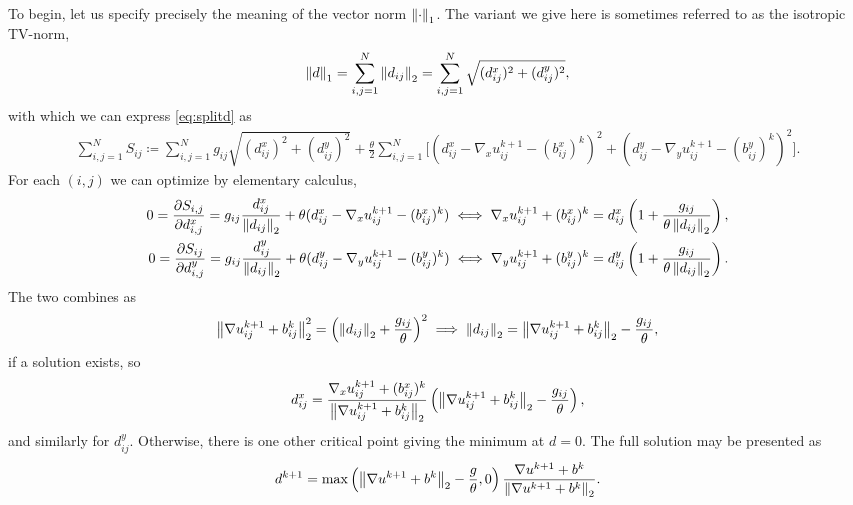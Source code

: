 To begin, let us specify precisely the meaning of the vector norm $\left\lVert\cdot \right\rVert_1$. The variant we give here is sometimes referred to as the isotropic TV-norm,
\begin{align*}
\left\lVert d \right\rVert_1
= \sum^N_{i,j = 1}  \left\lVert d_{ij}\right\rVert_2 
= \sum^{N}_{i,j = 1} \sqrt{ (d^x_{ij} )^2 + (d^y_{ij} )^2 },
\end{align*}
with which we can express \eqref{eq:splitd} as
\begin{align*}
\sum^N_{i,j=1} S_{ij}
\coloneqq
\sum^{N}_{i,j = 1} g_{ij} \sqrt{ (d^x_{ij} )^2 + (d^y_{ij} )^2 }
+ \frac{\theta}{2} \sum^N_{i,j=1} \big[ (d^x_{ij} - \nabla_x u^{k+1}_{ij} - (b^x_{ij})^k)^2 
+ (d^y_{ij} - \nabla_y u^{k+1}_{ij} - (b^y_{ij})^k)^2 
\big].
\end{align*}
For each $(i,j)$ we can optimize by elementary calculus, 
\begin{align*}
0
=\frac{\partial S_{i,j}}{\partial d^x_{i,j}} 
= g_{ij}\frac{d^x_{ij}}{ \left\lVert d_{ij}\right\rVert_2}
+ \theta (d^x_{ij} - \nabla_x u^{k+1}_{ij} - (b^x_{ij})^k) 
\iff
\nabla_x u^{k+1}_{ij} + (b^x_{ij})^k  
= d^x_{ij} \left( 1 + \frac{g_{ij}}{\theta \left\lVert d_{ij}\right\rVert_2}
\right),
\\
0
=\frac{\partial S_{ij}}{\partial d^y_{i,j}} 
= g_{ij}\frac{d^y_{ij}}{ \left\lVert d_{ij}\right\rVert_2}
+ \theta (d^y_{ij} - \nabla_y u^{k+1}_{ij} - (b^y_{ij})^k) 
\iff
\nabla_y u^{k+1}_{ij} + (b^y_{ij})^k 
= d^y_{ij} \left( 1 + \frac{g_{ij}}{\theta\left\lVert d_{ij}\right\rVert_2}
\right).
\end{align*}
The two combines as 
\begin{align*}
\left\lVert\nabla u^{k+1}_{ij} + b^k_{ij}\right\rVert_2^2 = \left(\left\lVert d_{ij}\right\rVert_2 + \frac{g_{ij}}{\theta}
\right)^2
\implies 
\left\lVert d_{ij}\right\rVert_2 = \left\lVert\nabla u^{k+1}_{ij} + b^k_{ij} \right\rVert_2 - \frac{g_{ij}}{\theta},
\end{align*}
if a solution exists, so
\begin{align*}
d_{ij}^x 
= \frac{ \nabla_x u^{k+1}_{ij} + (b^x_{ij})^k }{ \left\lVert\nabla u^{k+1}_{ij} + b^k_{ij} \right\rVert_2} \left( \left\lVert\nabla u^{k+1}_{ij} + b^k_{ij} \right\rVert_2 - \frac{g_{ij}}{\theta} \right), 
\end{align*}
and similarly for $d^y_{ij}$. Otherwise, there is one other critical point giving the minimum at $d = 0$. The full solution may be presented as
\begin{align}
d^{k+1}
= \max\left( \left\lVert \nabla u^{k+1} + b^k\right\rVert_2 - \frac{g}{\theta}, 0 \right) \frac{ \nabla u^{k+1} + b^k}{ \left\lVert \nabla u^{k+1} + b^k\right\rVert_2}.
\label{eq:sbdij}
\end{align}

